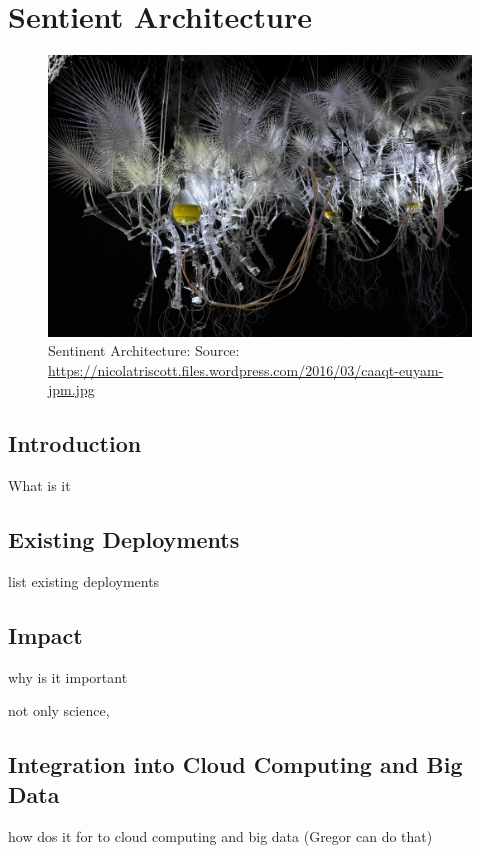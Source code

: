 \chapter{Sentient Architecture}

\begin{figure}
\centering
\includegraphics[width=\columnwidth]{images/sentient.jpeg}
\caption{Sentinent Architecture: Source: \url{https://nicolatriscott.files.wordpress.com/2016/03/caaqt-euyam-jpm.jpg}} 
\end{figure}

\section{Introduction}

What is it

\section{Existing Deployments}

list	existing deployments

\section{Impact}

why is it important

not only science, 

\section{Integration into Cloud Computing and Big Data}

how dos it for to cloud computing and big data (Gregor can do that)


